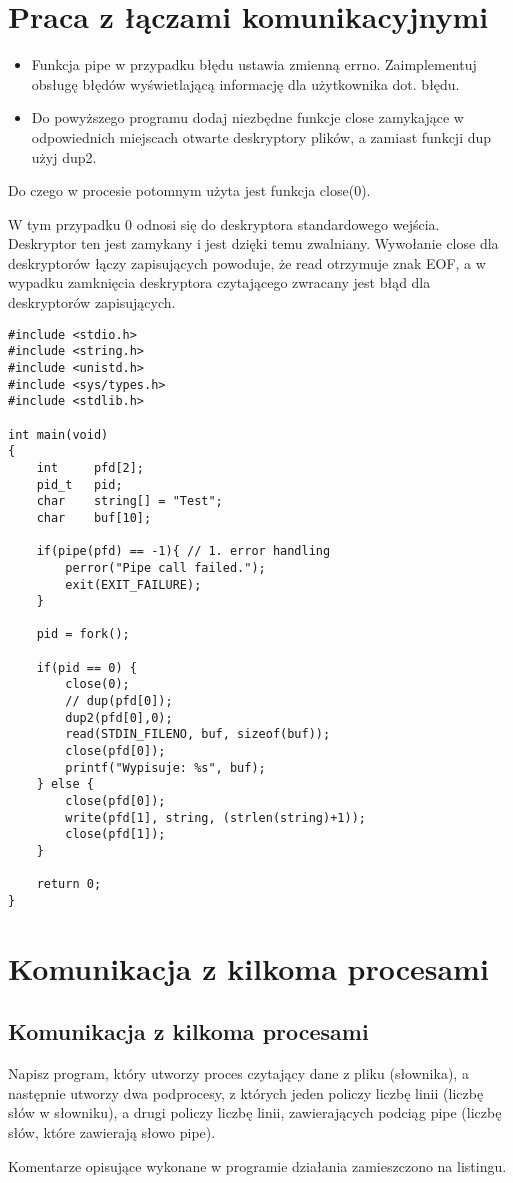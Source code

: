 \documentclass[a4paper,15pt]{article}
\newcommand{\ask}[2]{
    \begin{tcolorbox}[colback=black!5!white,colframe=gray,title={Pytanie #1}]
        #2
    \end{tcolorbox}
}
\newcommand{\assignment}[2]{
    \begin{tcolorbox}[colback=black!5!white,colframe=black,title={Zadanie #1}]
        #2
    \end{tcolorbox}
}
\begin{document}
\newpage
\section{Praca z łączami komunikacyjnymi}
\assignment{2}{
 \begin{itemize}
 \item Funkcja pipe w przypadku błędu ustawia zmienną errno. Zaimplementuj obsługę błędów wyświetlającą informację dla użytkownika dot. błędu. 
 \item Do powyższego programu dodaj niezbędne funkcje close zamykające w odpowiednich miejscach otwarte deskryptory plików, a zamiast funkcji dup użyj dup2. 
 \end{itemize}
}

\ask{2}{Do czego w procesie potomnym użyta jest funkcja close(0).}
W tym przypadku 0 odnosi się do deskryptora standardowego wejścia. Deskryptor ten jest zamykany i jest dzięki temu zwalniany. Wywołanie close dla deskryptorów łączy zapisujących powoduje, że read otrzymuje znak EOF, a w wypadku zamknięcia deskryptora czytającego zwracany jest błąd dla deskryptorów zapisujących. 

\begin{lstlisting}[style=CStyle, label=some-code, caption=dup-example.c]
#include <stdio.h>
#include <string.h>
#include <unistd.h>
#include <sys/types.h>
#include <stdlib.h>
    
int main(void)
{
    int     pfd[2];
    pid_t   pid;
    char    string[] = "Test";
    char    buf[10];

    if(pipe(pfd) == -1){ // 1. error handling
        perror("Pipe call failed.");
        exit(EXIT_FAILURE);
    }

    pid = fork();

    if(pid == 0) {
        close(0);              
        // dup(pfd[0]);
        dup2(pfd[0],0);
        read(STDIN_FILENO, buf, sizeof(buf));
        close(pfd[0]);
        printf("Wypisuje: %s", buf);
    } else {
        close(pfd[0]);
        write(pfd[1], string, (strlen(string)+1));    
        close(pfd[1]);    
    }

    return 0;
}

\end{lstlisting}

\section{Komunikacja z kilkoma procesami}
\subsection{Komunikacja z kilkoma procesami}
\assignment{3.1}{
Napisz program, który utworzy proces czytający dane z pliku (słownika), a następnie utworzy dwa podprocesy, z których jeden policzy liczbę linii (liczbę słów w słowniku), a drugi policzy liczbę linii, zawierających podciąg pipe (liczbę słów, które  zawierają słowo pipe). 
}
Komentarze opisujące wykonane w programie działania zamieszczono na listingu.
\end{document}

